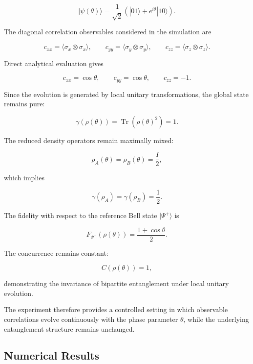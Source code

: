 \begin{equation}
|\psi(\theta)\rangle
=
\frac{1}{\sqrt{2}}
\left(
|01\rangle + e^{i\theta}|10\rangle
\right).
\label{eq:phase_evolved_bell_state}
\end{equation}

The diagonal correlation observables considered in the simulation are

\[
c_{xx}
=
\langle \sigma_x \otimes \sigma_x \rangle,
\qquad
c_{yy}
=
\langle \sigma_y \otimes \sigma_y \rangle,
\qquad
c_{zz}
=
\langle \sigma_z \otimes \sigma_z \rangle.
\]

Direct analytical evaluation gives

\[
c_{xx} = \cos\theta,
\qquad
c_{yy} = \cos\theta,
\qquad
c_{zz} = -1.
\]

Since the evolution is generated by local unitary transformations, the global state remains pure:

\[
\gamma(\rho(\theta))
=
\operatorname{Tr}
\left(
\rho(\theta)^2
\right)
=
1.
\]

The reduced density operators remain maximally mixed:

\[
\rho_A(\theta)
=
\rho_B(\theta)
=
\frac{I}{2},
\]

which implies

\[
\gamma(\rho_A)
=
\gamma(\rho_B)
=
\frac{1}{2}.
\]

The fidelity with respect to the reference Bell state \( |\Psi^+\rangle \) is

\[
F_{\Psi^+}(\rho(\theta))
=
\frac{1+\cos\theta}{2}.
\]

The concurrence remains constant:

\[
C(\rho(\theta))
=
1,
\]

demonstrating the invariance of bipartite entanglement under local unitary evolution.

\medskip

The experiment therefore provides a controlled setting in which observable correlations evolve continuously with the phase parameter \( \theta \), while the underlying entanglement structure remains unchanged.


\subsection{Numerical Results}

